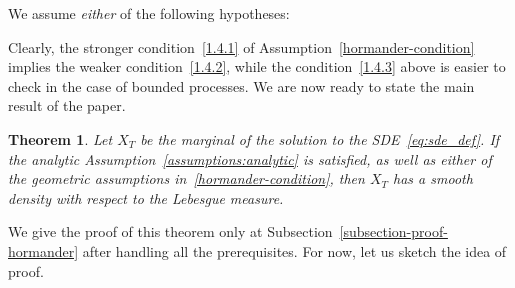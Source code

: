 \documentclass[11pt]{article}
\makeatletter
\newtheorem{theo}{Theorem}[section]
\theoremstyle{definition}
\numberwithin{equation}{section}
\numberwithin{figure}{section}
\numberwithin{table}{section}
\newcommand{\alp}{\alpha}%
\newcommand*\Cc{\mathcal{C}}
\newcommand*\Vc{\mathcal{V}}
\newcommand*\xb{\mathbf{x}}
\let\oldexists\exists
\renewcommand*{\exists}{\mathrel{\oldexists}}
\let\save@mathaccent\mathaccent
\newcommand*\if@single[3]{%
  \setbox0\hbox{${\mathaccent"0362{#1}}^H$}%
  \setbox2\hbox{${\mathaccent"0362{\kern0pt#1}}^H$}%
  \ifdim\ht0=\ht2 #3\else #2\fi
  }
\newcommand*\rel@kern[1]{\kern#1\dimexpr\macc@kerna}
\newcommand*\widebar[1]{\@ifnextchar^{{\wide@bar{#1}{0}}}{\wide@bar{#1}{1}}}
\newcommand*\wide@bar[2]{\if@single{#1}{\wide@bar@{#1}{#2}{1}}{\wide@bar@{#1}{#2}{2}}}
\newcommand*\wide@bar@[3]{%
  \begingroup
  \def\mathaccent##1##2{%
    \let\mathaccent\save@mathaccent
    \if#32 \let\macc@nucleus\first@char \fi
    \setbox\z@\hbox{$\macc@style{\macc@nucleus}_{}$}%
    \setbox\tw@\hbox{$\macc@style{\macc@nucleus}{}_{}$}%
    \dimen@\wd\tw@
    \advance\dimen@-\wd\z@
    \divide\dimen@ 3
    \@tempdima\wd\tw@
    \advance\@tempdima-\scriptspace
    \divide\@tempdima 10
    \advance\dimen@-\@tempdima
    \ifdim\dimen@>\z@ \dimen@0pt\fi
    \rel@kern{0.6}\kern-\dimen@
    \if#31
      \overline{\rel@kern{-0.6}\kern\dimen@\macc@nucleus\rel@kern{0.4}\kern\dimen@}%
      \advance\dimen@0.4\dimexpr\macc@kerna
      \let\final@kern#2%
      \ifdim\dimen@<\z@ \let\final@kern1\fi
      \if\final@kern1 \kern-\dimen@\fi
    \else
      \overline{\rel@kern{-0.6}\kern\dimen@#1}%
    \fi
  }%
  \macc@depth\@ne
  \let\math@bgroup\@empty \let\math@egroup\macc@set@skewchar
  \mathsurround\z@ \frozen@everymath{\mathgroup\macc@group\relax}%
  \macc@set@skewchar\relax
  \let\mathaccentV\macc@nested@a
  \if#31
    \macc@nested@a\relax111{#1}%
  \else
    \def\gobble@till@marker##1\endmarker{}%
    \futurelet\first@char\gobble@till@marker#1\endmarker
    \ifcat\noexpand\first@char A\else
      \def\first@char{}%
    \fi
    \macc@nested@a\relax111{\first@char}%
  \fi
  \endgroup
}
\renewcommand*{\bar}[1]{\widebar{#1}}
\makeatother
\begin{document}
\begin{assumption}\label{hormander-condition}
We assume \emph{either} of the following hypotheses:
\end{assumption}


Clearly, the stronger condition~\eqref{1.4.1} of Assumption~\ref{hormander-condition} implies the weaker condition~\eqref{1.4.2}, while the condition~\eqref{1.4.3} above is easier to check in the case of bounded processes. We are now ready to state the main result of the paper.

\begin{theo}\label{thm:hormander}
Let $X_T$ be the marginal of the solution to the SDE~\eqref{eq:sde_def}. If the analytic Assumption~\ref{assumptions:analytic} is satisfied, as well as either of the geometric assumptions in~\ref{hormander-condition}, then $X_T$ has a smooth density with respect to the Lebesgue measure.
\end{theo}

We give the proof of this theorem only at Subsection~\ref{subsection-proof-hormander} after handling all the prerequisites. For now, let us sketch the idea of proof.
\end{document}
